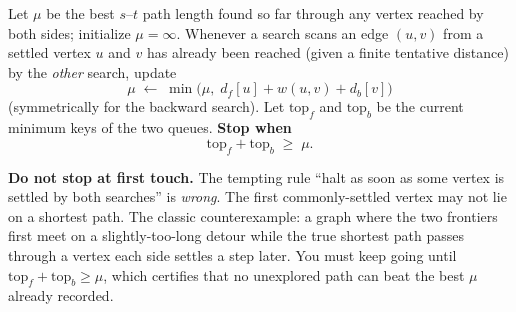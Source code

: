 Let $\mu$ be the best $s$--$t$ path length found so far through any vertex
reached by both sides; initialize $\mu=\infty$. Whenever a search scans an edge
$(u,v)$ from a settled vertex $u$ and $v$ has already been reached (given a finite
tentative distance) by the \emph{other} search, update
\[
  \mu \;\gets\; \min\bigl(\mu,\; d_f[u]+w(u,v)+d_b[v]\bigr)
\]
(symmetrically for the backward search). Let $\mathrm{top}_f$ and
$\mathrm{top}_b$ be the current minimum keys of the two queues. \textbf{Stop when}
\[
  \mathrm{top}_f + \mathrm{top}_b \;\ge\; \mu .
\]

\begin{trapbox}
\textbf{Do not stop at first touch.} The tempting rule ``halt as soon as some
vertex is settled by both searches'' is \emph{wrong}. The first commonly-settled
vertex may not lie on a shortest path. The classic counterexample: a graph where
the two frontiers first meet on a slightly-too-long detour while the true
shortest path passes through a vertex each side settles a step later. You must
keep going until $\mathrm{top}_f+\mathrm{top}_b\ge\mu$, which certifies that no
unexplored path can beat the best $\mu$ already recorded.
\end{trapbox}

